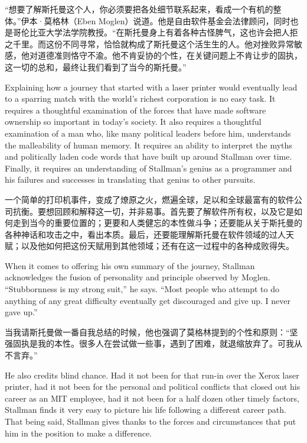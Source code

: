 \ifdefined\chs
“想要了解斯托曼这个人，你必须要把各处细节联系起来，看成一个有机的整体。”伊本·莫格林（Eben Moglen）说道。他是自由软件基金会法律顾问，同时也是哥伦比亚大学法学院教授。“在斯托曼身上有着各种古怪脾气，这也许会把人拒之千里。而这份不同寻常，恰恰就构成了斯托曼这个活生生的人。他对挫败异常敏感，他对道德准则恪守不渝。他不肯妥协的个性，在关键问题上不肯让步的固执，这一切的总和，最终让我们看到了当今的斯托曼。”
\fi

\ifdefined\eng
Explaining how a journey that started with a laser printer would eventually lead to a sparring match with the world's richest corporation is no easy task. It requires a thoughtful examination of the forces that have made software ownership so important in today's society. It also requires a thoughtful examination of a man who, like many political leaders before him, understands the malleability of human memory. It requires an ability to interpret the myths and politically laden code words that have built up around Stallman over time. Finally, it requires an understanding of Stallman's genius as a programmer and his failures and successes in translating that genius to other pursuits.
\fi

\ifdefined\chs
一个简单的打印机事件，变成了燎原之火，燃遍全球，足以和全球最富有的软件公司抗衡。要想回顾和解释这一切，并非易事。首先要了解软件所有权，以及它是如何走到当今的重要位置的；更要和人类健忘的本性做斗争；还要能从关于斯托曼的各种神话和攻击之中，看出本质。最后，还要能理解斯托曼在软件领域的过人天赋；以及他如何把这份天赋用到其他领域；还有在这一过程中的各种成败得失。
\fi

\ifdefined\eng
When it comes to offering his own summary of the journey, Stallman acknowledges the fusion of personality and principle observed by Moglen. ``Stubbornness is my strong suit,'' he says. ``Most people who attempt to do anything of any great difficulty eventually get discouraged and give up. I never gave up.''
\fi

\ifdefined\chs
当我请斯托曼做一番自我总结的时候，他也强调了莫格林提到的个性和原则：“坚强固执是我的本性。很多人在尝试做一些事，遇到了困难，就退缩放弃了。可我从不言弃。”
\fi

\ifdefined\eng
He also credits blind chance. Had it not been for that run-in over the Xerox laser printer, had it not been for the personal and political conflicts that closed out his career as an MIT employee, had it not been for a half dozen other timely factors, Stallman finds it very easy to picture his life following a different career path. That being said, Stallman gives thanks to the forces and circumstances that put him in the position to make a difference.
\fi

